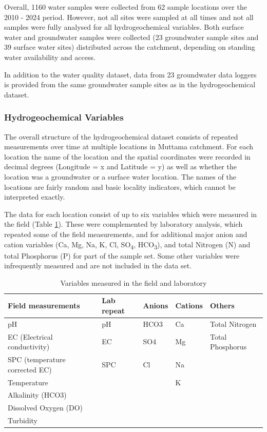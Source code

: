 \documentclass[, manuscript]{copernicus}
\begin{document}
Overall, 1160 water samples were collected from 62 sample locations over
the 2010 - 2024 period. However, not all sites were sampled at all times
and not all samples were fully analysed for all hydrogeochemical
variables. Both surface water and groundwater samples were collected (23
groundwater sample sites and 39 surface water sites) distributed across
the catchment, depending on standing water availability and access.

In addition to the water quality dataset, data from 23 groundwater data
loggers is provided from the same groundwater sample sites as in the
hydrogeochemical dataset.

\subsubsection{Hydrogeochemical Variables}

The overall structure of the hydrogeochemical dataset consists of
repeated measurements over time at multiple locations in Muttama
catchment. For each location the name of the location and the spatial
coordinates were recorded in decimal degrees (Longitude = x and Latitude
= y) as well as whether the location was a groundwater or a surface
water location. The names of the locations are fairly random and basic
locality indicators, which cannot be interpreted exactly.

The data for each location consist of up to six variables which were
measured in the field (Table \ref{tab:TableMeasurements}). These were
complemented by laboratory analysis, which repeated some of the field
measurements, and for additional major anion and cation variables (Ca,
Mg, Na, K, Cl, SO\textsubscript{4}, HCO\textsubscript{3}), and total
Nitrogen (N) and total Phosphorus (P) for part of the sample set. Some
other variables were infrequently measured and are not included in the
data set.

\begin{table}
\centering
\caption{\label{tab:TableMeasurements}Variables measured in the field and laboratory}
\centering
\begin{tabular}[t]{l|l|l|l|l}
\hline
Field measurements & Lab repeat & Anions & Cations & Others\\
\hline
pH & pH & HCO3 & Ca & Total Nitrogen\\
\hline
EC (Electrical conductivity) & EC & SO4 & Mg & Total Phosphorus\\
\hline
SPC (temperature corrected EC) & SPC & Cl & Na & \\
\hline
Temperature &  &  & K & \\
\hline
Alkalinity (HCO3) &  &  &  & \\
\hline
Dissolved Oxygen (DO) &  &  &  & \\
\hline
Turbidity &  &  &  & \\
\hline
\end{tabular}
\end{table}
\end{document}
